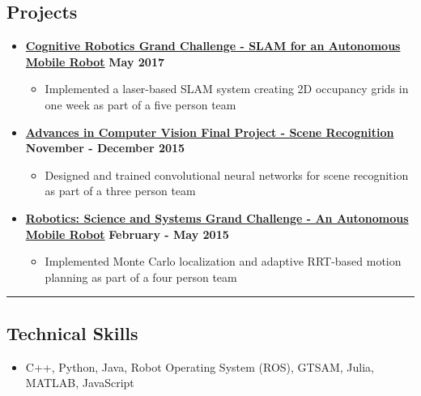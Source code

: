 \documentclass[10pt,letterpaper]{article}
\begin{document}
\subsection*{Projects}
  \begin{itemize}
    \parskip=-0.1em
    
    \item[]
    {\href{https://ocw.mit.edu/courses/aeronautics-and-astronautics/16-412j-cognitive-robotics-spring-2005/index.htm}{\textbf{Cognitive Robotics Grand Challenge - SLAM for an Autonomous Mobile Robot}} \hfill
      \textbf{May 2017}}

    \begin{itemize}[label=\textbullet]
      \itemsep0em
      \item Implemented a laser-based SLAM system creating 2D occupancy grids in one week as part of a five person team
      \end{itemize}    
   
    \item[]
    {\href{http://6.869.csail.mit.edu/}{\textbf{Advances in Computer Vision Final Project - Scene Recognition}} \hfill
      \textbf{November - December 2015}}

    \begin{itemize}[label=\textbullet]
      \itemsep0em
      \item Designed and trained convolutional neural networks for scene recognition as part of a three person team
      \end{itemize}    
    
    \item[]
    {\href{http://courses.csail.mit.edu/rss/}{\textbf{Robotics: Science and Systems Grand Challenge - An Autonomous Mobile Robot}} \hfill
      \textbf{February - May 2015}}

    \begin{itemize}[label=\textbullet]
      \itemsep0em
      \item Implemented Monte Carlo localization and adaptive RRT-based motion planning as part of a four person team
      \end{itemize}    
\end{itemize}

\hrule
\vspace{-0.6em}

\subsection*{Technical Skills}
\begin{itemize}
	\item[] C++, Python, Java, Robot Operating System (ROS), GTSAM, Julia, MATLAB, JavaScript
\end{itemize}
\end{document}
